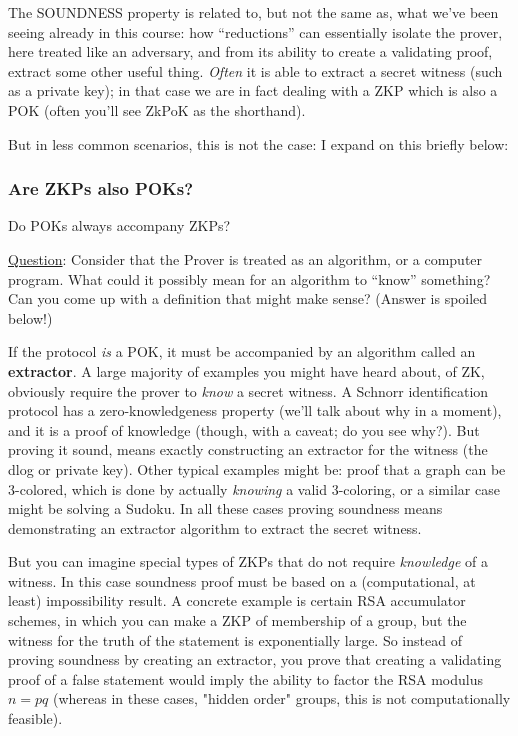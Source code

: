 \documentclass[10pt,a4paper]{article}
\begin{document}
The SOUNDNESS property is related to, but not the same as, what we've been seeing already in this course: how ``reductions'' can essentially isolate the prover, here treated like an adversary, and from its ability to create a validating proof, extract some other useful thing. \emph{Often} it is able to extract a secret witness (such as a private key); in that case we are in fact dealing with a ZKP which is also a POK (often you'll see ZkPoK as the shorthand).

\vspace{5 pt}
But in less common scenarios, this is not the case: I expand on this briefly below:

\subsubsection{Are ZKPs also POKs?}

Do POKs always accompany ZKPs?

\underline{Question}: Consider that the Prover is treated as an algorithm, or a computer program. What could it possibly mean for an algorithm to ``know'' something? Can you come up with a definition that might make sense? (Answer is spoiled below!)

\pagebreak

 If the protocol \emph{is} a POK, it must be accompanied by an algorithm called an \textbf{extractor}. A large majority of examples you might have heard about, of ZK, obviously require the prover to \emph{know} a secret witness. A Schnorr identification protocol has a zero-knowledgeness property (we'll talk about why in a moment), and it is a proof of knowledge (though, with a caveat; do you see why?). But proving it sound, means exactly constructing an extractor for the witness (the dlog or private key). Other typical examples might be: proof that a graph can be 3-colored, which is done by actually \emph{knowing} a valid 3-coloring, or a similar case might be solving a Sudoku. In all these cases proving soundness means demonstrating an extractor algorithm to extract the secret witness.


\vspace{5 pt}

But you can imagine special types of ZKPs that do not require \emph{knowledge} of a witness. In this case soundness proof must be based on a (computational, at least) impossibility result. A concrete example is certain RSA accumulator schemes, in which you can make a ZKP of membership of a group, but the witness for the truth of the statement is exponentially large. So instead of proving soundness by creating an extractor, you prove that creating a validating proof of a false statement would imply the ability to factor the RSA modulus $n = pq$ (whereas in these cases, "hidden order" groups, this is not computationally feasible).
\end{document}
